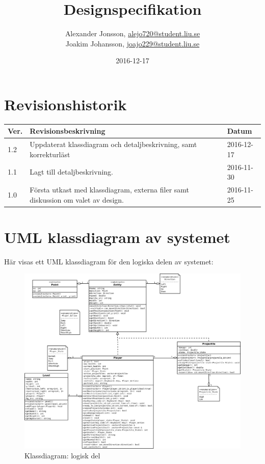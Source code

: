 \documentclass{TDP003mall}
\author{Alexander Jonsson, \url{alejo720@student.liu.se}\\
  Joakim Johansson, \url{joajo229@student.liu.se}}
\title{Designspecifikation}
\date{2016-12-17}
\begin{document}
\projectpage

\tableofcontents

\newpage

\section{Revisionshistorik}
\begin{table}[!h]
\begin{tabularx}{\linewidth}{|l|X|l|}
\hline
Ver. & Revisionsbeskrivning & Datum \\\hline
1.2 & Uppdaterat klassdiagram och detaljbeskrivning, samt korrekturläst & 2016-12-17 \\\hline
1.1 & Lagt till detaljbeskrivning. & 2016-11-30 \\\hline
1.0 & Första utkast med klassdiagram, externa filer samt diskussion om valet av design. & 2016-11-25 \\\hline
\end{tabularx}
\end{table}

\newpage

\section{UML klassdiagram av systemet}
Här visas ett UML klassdiagram för den logiska delen av systemet:
\begin{figure}[H]
    \centering
    \includegraphics[width = \linewidth]{classdiagram_logic.png}
    \caption{Klassdiagram: logisk del}
    \label{fig:classdiagraM_logic}
\end{figure}
\end{document}
